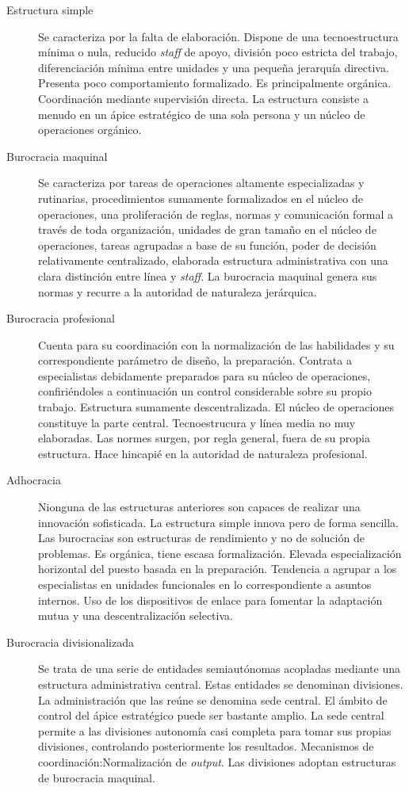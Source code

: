 \documentclass[12pt]{article}
\theoremstyle{definition_wo_parentheses}
\begin{document}
\begin{description}
\item[Estructura simple] Se caracteriza por la falta de elaboración. Dispone de una tecnoestructura mínima o nula, reducido \textit{staff} de apoyo, división poco estricta del trabajo, diferenciación mínima entre unidades y una pequeña jerarquía directiva. Presenta poco comportamiento formalizado. Es principalmente orgánica. Coordinación mediante supervisión directa. La estructura consiste a menudo en un ápice estratégico de una sola persona y un núcleo de operaciones orgánico.
\item[Burocracia maquinal] Se caracteriza por tareas de operaciones altamente especializadas y rutinarias, procedimientos sumamente formalizados en el núcleo de operaciones, una proliferación de reglas, normas y comunicación formal a través de toda organización, unidades de gran tamaño en el núcleo de operaciones, tareas agrupadas a base de su función, poder de decisión relativamente centralizado, elaborada estructura administrativa con una clara distinción entre línea y \textit{staff}. La burocracia maquinal genera sus normas y recurre a la autoridad de naturaleza jerárquica.

\item[Burocracia profesional] Cuenta para su coordinación con la normalización de las habilidades y su correspondiente parámetro de diseño, la preparación. Contrata a especialistas debidamente preparados para su núcleo de operaciones, confiriéndoles a continuación un control considerable sobre su propio trabajo. Estructura sumamente descentralizada. El núcleo de operaciones constituye la parte central. Tecnoestrucura y línea media no muy elaboradas. Las normes surgen, por regla general, fuera de su propia estructura. Hace hincapié en la autoridad de naturaleza profesional.

\item[Adhocracia] Nionguna de las estructuras anteriores son capaces de realizar una innovación sofisticada. La estructura simple innova pero de forma sencilla. Las burocracias son estructuras de rendimiento y no de solución de problemas. Es orgánica, tiene escasa formalización. Elevada especialización horizontal del puesto basada en la preparación. Tendencia a agrupar a los especialistas en unidades funcionales en lo correspondiente a asuntos internos. Uso de los dispositivos de enlace para fomentar la adaptación mutua y una descentralización selectiva.

\item[Burocracia divisionalizada] Se trata de una serie de entidades semiautónomas acopladas mediante una estructura administrativa central. Estas entidades se denominan divisiones. La administración que las reúne se denomina sede central. El ámbito de control del ápice estratégico puede ser bastante amplio. La sede central permite a las divisiones autonomía casi completa para tomar sus propias divisiones, controlando posteriormente los resultados. Mecanismos de coordinación:Normalización de \textit{output}. Las divisiones adoptan estructuras de burocracia maquinal.
\end{description}
\end{document}

